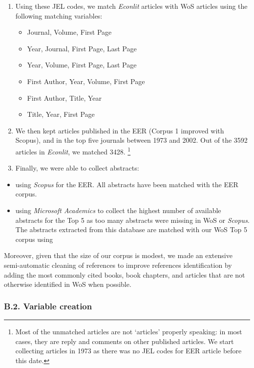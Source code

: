 \documentclass[
  12pt,
  onecolumn]{article}
\providecommand{\tightlist}{%
  \setlength{\itemsep}{0pt}\setlength{\parskip}{0pt}}
\begin{document}
\begin{enumerate}
\def\labelenumi{\arabic{enumi}.}
\setcounter{enumi}{1}
\tightlist
\item
  Using these JEL codes, we match \emph{Econlit} articles with WoS articles using the following matching variables:

  \begin{itemize}
  \tightlist
  \item
    Journal, Volume, First Page
  \item
    Year, Journal, First Page, Last Page
  \item
    Year, Volume, First Page, Last Page
  \item
    First Author, Year, Volume, First Page
  \item
    First Author, Title, Year
  \item
    Title, Year, First Page
  \end{itemize}
\item
  We then kept articles published in the EER (Corpus 1 improved with Scopus), and in the top five journals between 1973 and 2002. Out of the 3592 articles in \emph{Econlit}, we matched 3428. \footnote{Most of the unmatched articles are not `articles' properly speaking: in most cases, they are reply and comments on other published articles. We start collecting articles in 1973 as there was no JEL codes for EER article before this date.}
\item
  Finally, we were able to collect abstracts:
\end{enumerate}

\begin{itemize}
\tightlist
\item
  using \emph{Scopus} for the EER. All abstracts have been matched with the EER corpus.
\item
  using \emph{Microsoft Academics} to collect the highest number of available abstracts for the Top 5 as too many abstracts were missing in WoS or \emph{Scopus}. The abstracts extracted from this database are matched with our WoS Top 5 corpus using
\end{itemize}

Moreover, given that the size of our corpus is modest, we made an extensive semi-automatic cleaning of references to improve references identification by adding the most commonly cited books, book chapters, and articles that are not otherwise identified in WoS when possible.

\hypertarget{b.2.-variable-creation}{%
\subsubsection*{B.2. Variable creation}\label{b.2.-variable-creation}}
\end{document}
